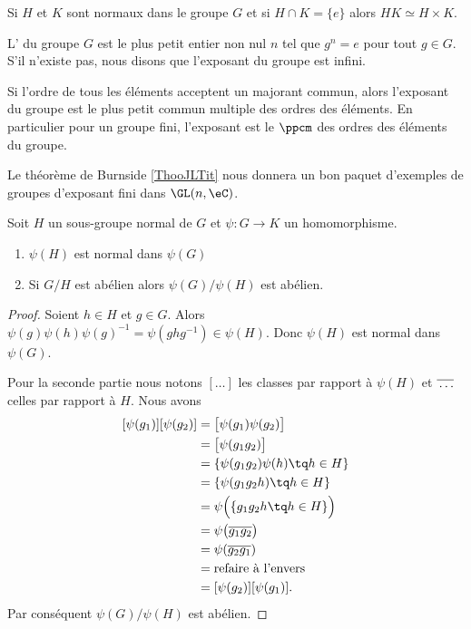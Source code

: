 \begin{lemma}\label{LemHUkMxp}
    Si \( H\) et \( K\) sont normaux dans le groupe \( G\) et si \( H\cap K=\{ e \}\) alors \( HK\simeq H\times K\).
\end{lemma}

\begin{definition}  \label{DefvtSAyb}
    L' du groupe \( G\) est le plus petit entier non nul \( n\) tel que \( g^n=e\) pour tout \( g\in G\). S'il n'existe pas, nous disons que l'exposant du groupe est infini.
\end{definition}
Si l'ordre de tous les éléments acceptent un majorant commun, alors l'exposant du groupe est le plus petit commun multiple des ordres des éléments. En particulier pour un groupe fini, l'exposant est le $\ppcm$ des ordres des éléments du groupe.

Le théorème de Burnside \ref{ThooJLTit} nous donnera un bon paquet d'exemples de groupes d'exposant fini dans \( \GL(n,\eC)\).

\begin{proposition} \label{PropSRMJooIDPBoW}
    Soit \( H\) un sous-groupe normal de \( G\) et \( \psi\colon G\to K\) un homomorphisme. 
    \begin{enumerate}
        \item
            \( \psi(H)\) est normal dans \( \psi(G)\)
        \item
            Si \( G/H\) est abélien alors \( \psi(G)/\psi(H)\) est abélien.
    \end{enumerate}
\end{proposition}

\begin{proof}
    Soient \( h\in H\) et \( g\in G\). Alors \( \psi(g)\psi(h)\psi(g)^{-1}=\psi(ghg^{-1})\in\psi(H)\). Donc \( \psi(H)\) est normal dans \( \psi(G)\).

    Pour la seconde partie nous notons \( [\ldots]\) les classes par rapport à \( \psi(H)\) et \( \overline{ \vphantom{g}\ldots }\) celles par rapport à \( H\). Nous avons
    \begin{subequations}
        \begin{align}
            [\psi(g_1)][\psi(g_2)]&=\big[ \psi(g_1)\psi(g_2) \big]\\
            &=\big[ \psi(g_1g_2) \big]\\
            &=\{ \psi(g_1g_2)\psi(h)\tq h\in H \}\\
            &=\{ \psi(g_1g_2h)\tq h\in H \}\\
            &=\psi\Big(  \{ g_1g_2h\tq h\in H \}  \Big) \\
            &=\psi\big( \overline{ g_1g_2 } \big)\\
            &=\psi(\overline{ g_2g_1 })\\
            &=\text{refaire à l'envers}\\
            &=[\psi(g_2)][\psi(g_1)].
        \end{align}
    \end{subequations}
    Par conséquent \( \psi(G)/\psi(H)\) est abélien.
\end{proof}

